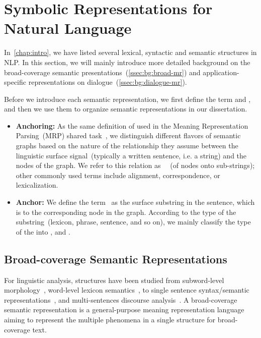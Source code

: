 \section[Symbolic Representations for Natural Language]{Symbolic Representations for \\Natural Language}
\label{sec:bg:symbolic}

In~\autoref{chap:intro}, we have listed several lexical, syntactic and
semantic structures in NLP. In this section, we will mainly introduce
more detailed background on the broad-coverage semantic
presentations~(\autoref{ssec:bg:broad-mr}) and application-specific
representations on dialogue~(\autoref{ssec:bg:dialogue-mr}).

Before we introduce each semantic representation, we first define the
term  and , and then we use them to organize
semantic representations in our dissertation.

\begin{itemize}
\item \textbf{Anchoring:} As the same definition of 
  used in the Meaning Representation Parsing~(MRP) shared
  task~\citep{Oep:Abe:Haj:19}, we distinguish different flavors of
  semantic graphs based on the nature of the relationship they assume
  between the linguistic surface signal~(typically a written sentence,
  i.e. a string) and the nodes of the graph. We refer to this relation
  as ~~(of nodes onto sub-strings); other commonly used
  terms include alignment, correspondence, or lexicalization.

\item \textbf{Anchor:} We define the term~ as the surface
  substring in the sentence, which is  to the
  corresponding node in the graph. According to the type of the
  substring~(lexicon, phrase, sentence, and so on), we mainly classify
  the type of the  into ,
   and .
\end{itemize}

\subsection{Broad-coverage Semantic Representations}
\label{ssec:bg:broad-mr}

For linguistic analysis, structures have been studied from
subword-level morphology~\citep{beesley2003finite}, word-level lexicon
semantics~\citep{miller1998wordnet}, to single sentence
syntax/semantic
representations~\citep{baker1998berkeley,palmer2005proposition,collins2003head},
and multi-sentences discourse
analysis~\citep{carlson2003building,wolf2005representing,prasad2008penn}. A
broad-coverage semantic representation is a general-purpose meaning
representation language aiming to represent the multiple phenomena in
a single structure for broad-coverage text.

